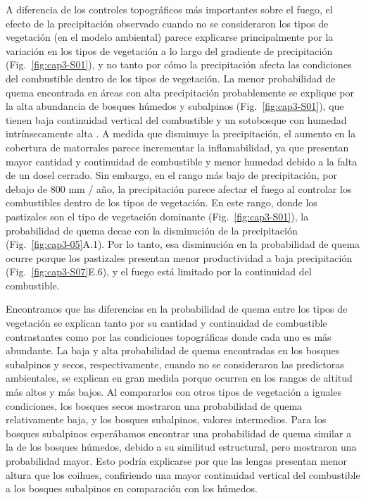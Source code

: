 A diferencia de los controles topográficos más importantes sobre el fuego, el efecto de la precipitación observado cuando no se consideraron los tipos de vegetación (en el modelo ambiental) parece explicarse principalmente por la variación en los tipos de vegetación a lo largo del gradiente de precipitación (Fig.~\ref{fig:cap3-S01}), y no tanto por cómo la precipitación afecta las condiciones del combustible dentro de los tipos de vegetación. La menor probabilidad de quema encontrada en áreas con alta precipitación probablemente se explique por la alta abundancia de bosques húmedos y subalpinos (Fig.~\ref{fig:cap3-S01}), que tienen baja continuidad vertical del combustible y un sotobosque con humedad intrínsecamente alta \citep{paritsis_positive_2015, tiribelli_changes_2018, barbera_microclimate_2023}. A medida que disminuye la precipitación, el aumento en la cobertura de matorrales parece incrementar la inflamabilidad, ya que presentan mayor cantidad y continuidad de combustible y menor humedad debido a la falta de un dosel cerrado. Sin embargo, en el rango más bajo de precipitación, por debajo de 800 mm / año, la precipitación parece afectar el fuego al controlar los combustibles dentro de los tipos de vegetación. En este rango, donde los pastizales son el tipo de vegetación dominante (Fig.~\ref{fig:cap3-S01}), la probabilidad de quema decae con la disminución de la precipitación (Fig.~\ref{fig:cap3-05}A.1). Por lo tanto, esa disminución en la probabilidad de quema ocurre porque los pastizales presentan menor productividad a baja precipitación (Fig.~\ref{fig:cap3-S07}E.6), y el fuego está limitado por la continuidad del combustible.

Encontramos que las diferencias en la probabilidad de quema entre los tipos de vegetación se explican tanto por su cantidad y continuidad de combustible contrastantes como por las condiciones topográficas donde cada uno es más abundante. La baja y alta probabilidad de quema encontradas en los bosques subalpinos y secos, respectivamente, cuando no se consideraron las predictoras ambientales, se explican en gran medida porque ocurren en los rangos de altitud más altos y más bajos. Al compararlos con otros tipos de vegetación a iguales condiciones, los bosques secos mostraron una probabilidad de quema relativamente baja, y los bosques subalpinos, valores intermedios. Para los bosques subalpinos esperábamos encontrar una probabilidad de quema similar a la de los bosques húmedos, debido a su similitud estructural, pero mostraron una probabilidad mayor. Esto podría explicarse por que las lengas presentan menor altura que los coihues, confiriendo una mayor continuidad vertical del combustible a los bosques subalpinos en comparación con los húmedos.

